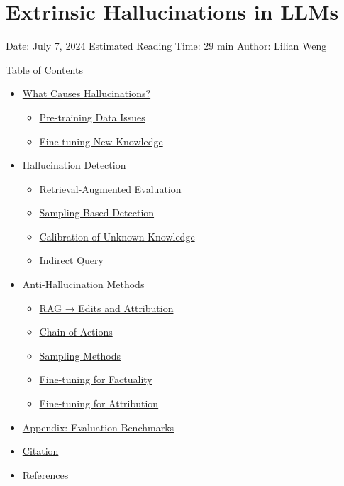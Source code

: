\section{Extrinsic Hallucinations in LLMs}\label{extrinsic-hallucinations-in-llms}

Date: July 7, 2024 \textbar{} Estimated Reading Time: 29 min \textbar{} Author: Lilian Weng

{Table of Contents}

\begin{itemize}
\tightlist
\item
  \hyperref[what-causes-hallucinations]{What Causes Hallucinations?}

  \begin{itemize}
  \tightlist
  \item
    \hyperref[pre-training-data-issues]{Pre-training Data Issues}
  \item
    \hyperref[fine-tuning-new-knowledge]{Fine-tuning New Knowledge}
  \end{itemize}
\item
  \hyperref[hallucination-detection]{Hallucination Detection}

  \begin{itemize}
  \tightlist
  \item
    \hyperref[retrieval-augmented-evaluation]{Retrieval-Augmented Evaluation}
  \item
    \hyperref[sampling-based-detection]{Sampling-Based Detection}
  \item
    \hyperref[calibration-of-unknown-knowledge]{Calibration of Unknown Knowledge}
  \item
    \hyperref[indirect-query]{Indirect Query}
  \end{itemize}
\item
  \hyperref[anti-hallucination-methods]{Anti-Hallucination Methods}

  \begin{itemize}
  \tightlist
  \item
    \hyperref[rag--edits-and-attribution]{RAG → Edits and Attribution}
  \item
    \hyperref[chain-of-actions]{Chain of Actions}
  \item
    \hyperref[sampling-methods]{Sampling Methods}
  \item
    \hyperref[fine-tuning-for-factuality]{Fine-tuning for Factuality}
  \item
    \hyperref[fine-tuning-for-attribution]{Fine-tuning for Attribution}
  \end{itemize}
\item
  \hyperref[appendix-evaluation-benchmarks]{Appendix: Evaluation Benchmarks}
\item
  \hyperref[citation]{Citation}
\item
  \hyperref[references]{References}
\end{itemize}

